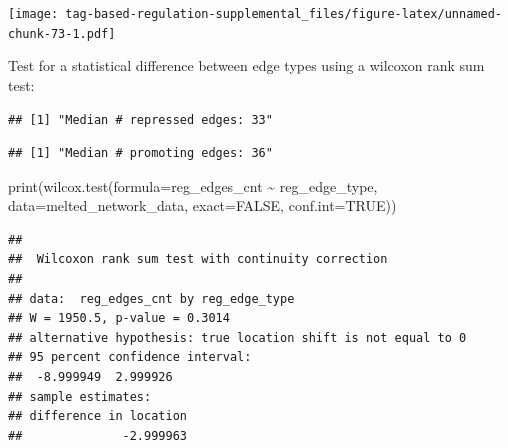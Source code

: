 \documentclass[
]{book}
\newenvironment{Shaded}{\begin{snugshade}}{\end{snugshade}}
\newcommand{\AttributeTok}[1]{\textcolor[rgb]{0.77,0.63,0.00}{#1}}
\newcommand{\ConstantTok}[1]{\textcolor[rgb]{0.00,0.00,0.00}{#1}}
\newcommand{\FunctionTok}[1]{\textcolor[rgb]{0.00,0.00,0.00}{#1}}
\newcommand{\NormalTok}[1]{#1}
\newcommand{\SpecialCharTok}[1]{\textcolor[rgb]{0.00,0.00,0.00}{#1}}
\newcommand{\StringTok}[1]{\textcolor[rgb]{0.31,0.60,0.02}{#1}}
\begin{document}
\texttt{[image: tag-based-regulation-supplemental\_files/figure-latex/unnamed-chunk-73-1.pdf]}

Test for a statistical difference between edge types using a wilcoxon rank sum test:

\begin{Shaded}
\end{Shaded}

\begin{verbatim}
## [1] "Median # repressed edges: 33"
\end{verbatim}

\begin{Shaded}
\end{Shaded}

\begin{verbatim}
## [1] "Median # promoting edges: 36"
\end{verbatim}

\begin{Shaded}
\begin{Highlighting}[]
\FunctionTok{print}\NormalTok{(}\FunctionTok{wilcox.test}\NormalTok{(}\AttributeTok{formula=}\NormalTok{reg\_edges\_cnt }\SpecialCharTok{\textasciitilde{}}\NormalTok{ reg\_edge\_type, }\AttributeTok{data=}\NormalTok{melted\_network\_data, }\AttributeTok{exact=}\ConstantTok{FALSE}\NormalTok{, }\AttributeTok{conf.int=}\ConstantTok{TRUE}\NormalTok{))}
\end{Highlighting}
\end{Shaded}

\begin{verbatim}
## 
##  Wilcoxon rank sum test with continuity correction
## 
## data:  reg_edges_cnt by reg_edge_type
## W = 1950.5, p-value = 0.3014
## alternative hypothesis: true location shift is not equal to 0
## 95 percent confidence interval:
##  -8.999949  2.999926
## sample estimates:
## difference in location 
##              -2.999963
\end{verbatim}
\end{document}
